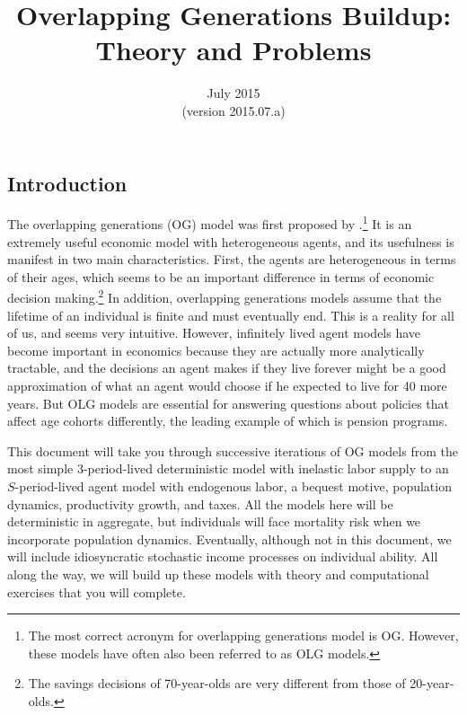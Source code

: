 \documentclass[letterpaper,12pt]{article}
\theoremstyle{definition}
\numberwithin{equation}{section}
\numberwithin{exercise}{section}
\begin{document}
\title{Overlapping Generations Buildup: \\
       Theory and Problems}
\date{July 2015\\
{\footnotesize{(version 2015.07.a)}}}
\author{}
\maketitle

\begin{spacing}{1.5}


\section{Introduction}\label{SecIntro}

   The overlapping generations (OG) model was first proposed by \citet{Samuelson:1958}.\footnote{The most correct acronym for overlapping generations model is OG. However, these models have often also been referred to as OLG models.} It is an extremely useful economic model with heterogeneous agents, and its usefulness is manifest in two main characteristics. First, the agents are heterogeneous in terms of their ages, which seems to be an important difference in terms of economic decision making.\footnote{The savings decisions of 70-year-olds are very different from those of 20-year-olds.} In addition, overlapping generations models assume that the lifetime of an individual is finite and must eventually end. This is a reality for all of us, and seems very intuitive. However, infinitely lived agent models have become important in economics because they are actually more analytically tractable, and the decisions an agent makes if they live forever might be a good approximation of what an agent would choose if he expected to live for 40 more years. But OLG models are essential for answering questions about policies that affect age cohorts differently, the leading example of which is pension programs.

   This document will take you through successive iterations of OG models from the most simple 3-period-lived deterministic model with inelastic labor supply to an $S$-period-lived agent model with endogenous labor, a bequest motive, population dynamics, productivity growth, and taxes. All the models here will be deterministic in aggregate, but individuals will face mortality risk when we incorporate population dynamics. Eventually, although not in this document, we will include idiosyncratic stochastic income processes on individual ability. All along the way, we will build up these models with theory and computational exercises that you will complete.



\end{spacing}
\end{document}
